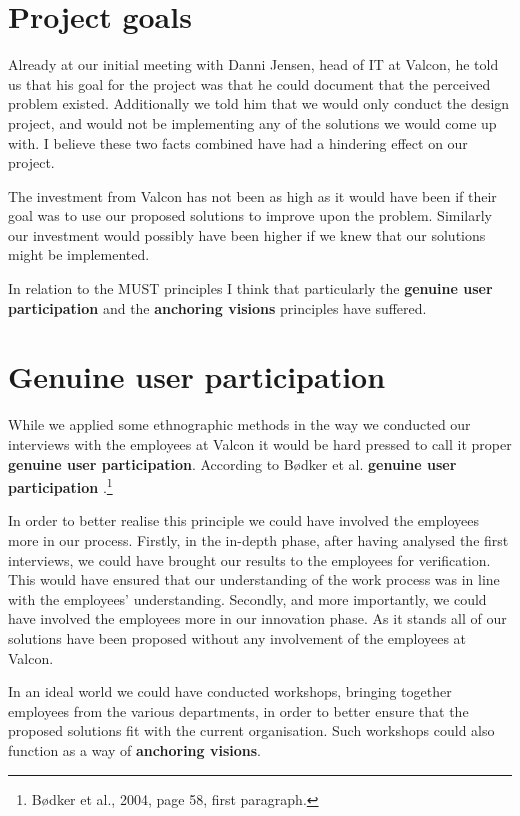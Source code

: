 \section*{Project goals}
Already at our initial meeting with Danni Jensen, head of IT at Valcon, he told us that his goal for the project was that he could document that the perceived problem existed.
Additionally we told him that we would only conduct the design project, and would not be implementing any of the solutions we would come up with.
I believe these two facts combined have had a hindering effect on our project.

The investment from Valcon has not been as high as it would have been if their goal was to use our proposed solutions to improve upon the problem.
Similarly our investment would possibly have been higher if we knew that our solutions might be implemented.

In relation to the MUST principles I think that particularly the \textbf{genuine user participation} and the \textbf{anchoring visions} principles have suffered.

\section*{Genuine user participation}
While we applied some ethnographic methods in the way we conducted our interviews with the employees at Valcon it would be hard pressed to call it proper \textbf{genuine user participation}.
According to Bødker et al. \textbf{genuine user participation} .\footnote{Bødker et al., 2004, page 58, first paragraph.}

In order to better realise this principle we could have involved the employees more in our process.
Firstly, in the in-depth phase, after having analysed the first interviews, we could have brought our results to the employees for verification.
This would have ensured that our understanding of the work process was in line with the employees' understanding.
Secondly, and more importantly, we could have involved the employees more in our innovation phase.
As it stands all of our solutions have been proposed without any involvement of the employees at Valcon.

In an ideal world we could have conducted workshops, bringing together employees from the various departments, in order to better ensure that the proposed solutions fit with the current organisation.
Such workshops could also function as a way of \textbf{anchoring visions}.


